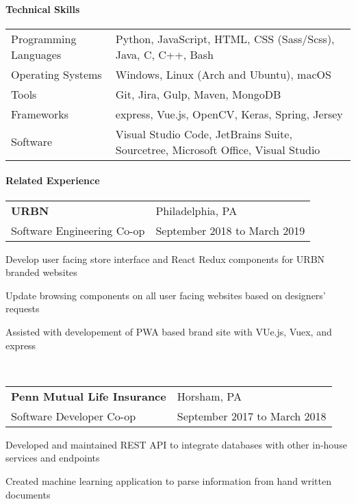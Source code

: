 \documentclass[10pt,]{article}
\let\oldparagraph\paragraph
\renewcommand{\paragraph}[1]{\oldparagraph{#1}\mbox{}}
\begin{document}
\hypertarget{technical-skills}{%
\paragraph{Technical Skills}\label{technical-skills}}

\begin{tabular}{l | l}
    Programming Languages & Python, JavaScript, HTML, CSS (Sass/Scss), Java, C, C++, Bash\\
    Operating Systems     & Windows, Linux (Arch and Ubuntu), macOS\\
    Tools             & Git, Jira, Gulp, Maven, MongoDB\\
    Frameworks        & express, Vue.js, OpenCV, Keras, Spring, Jersey\\
    Software          & Visual Studio Code, JetBrains Suite, Sourcetree, Microsoft Office, Visual Studio
\end{tabular}

\hypertarget{related-experience}{%
\paragraph{Related Experience}\label{related-experience}}

\begin{tabularx}{\textwidth}{l X}
    \textbf{URBN} & \hfill Philadelphia, PA\\
    Software Engineering Co-op        & \hfill September 2018 to March 2019
\end{tabularx}

\begin{list}{\quad}{}
    \item Develop user facing store interface and React Redux components for URBN branded websites
    \item Update browsing components on all user facing websites based on designers' requests
    \item Assisted with developement of PWA based brand site with VUe.js, Vuex, and express
\end{list}

~

\begin{tabularx}{\textwidth}{l X}
    \textbf{Penn Mutual Life Insurance} & \hfill Horsham, PA\\
    Software Developer Co-op        & \hfill September 2017 to March 2018
\end{tabularx}

\begin{list}{\quad}{}
    \item Developed and maintained REST API to integrate databases with other in-house services and endpoints
    \item Created machine learning application to parse information from hand written documents
\end{list}
\end{document}
